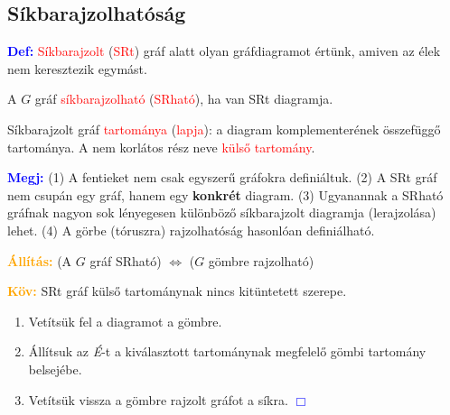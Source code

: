 \documentclass[../szamtud.tex]{subfiles}
\begin{document}
    \subsection{Síkbarajzolhatóság}

        \textcolor{blue}{\textbf{Def:}} \textcolor{red}{Síkbarajzolt} (\textcolor{red}{SRt}) gráf alatt olyan gráfdiagramot értünk, amiven az  élek nem keresztezik egymást.

        A $G$ gráf \textcolor{red}{síkbarajzolható} (\textcolor{red}{SRható}), ha van SRt diagramja. 

        Síkbarajzolt gráf \textcolor{red}{tartománya} (\textcolor{red}{lapja}): a diagram komplementerének összefüggő tartománya. A nem korlátos rész neve \textcolor{red}{külső tartomány}. 

        \textcolor{blue}{\textbf{Megj:}} (1) A fentieket nem csak egyszerű gráfokra definiáltuk. (2) A SRt gráf nem csupán egy gráf, hanem egy \textbf{konkrét} diagram. (3) Ugyanannak a SRható gráfnak nagyon sok lényegesen különböző síkbarajzolt diagramja (lerajzolása) lehet. (4) A görbe (tóruszra) rajzolhatóság hasonlóan definiálható.

        \textcolor{orange}{\textbf{Állítás:}} (A $G$ gráf SRható) $\Longleftrightarrow$ ($G$ gömbre rajzolható) 


        \textcolor{orange}{\textbf{Köv:}} SRt gráf külső tartománynak nincs kitüntetett szerepe.


        \begin{enumerate}
            \item Vetítsük fel a diagramot a gömbre.
            \item Állítsuk az \textit{É}-t a kiválasztott tartománynak megfelelő gömbi tartomány belsejébe.
            \item Vetítsük vissza a gömbre rajzolt gráfot a síkra. \textcolor{blue}{$\Box$}
        \end{enumerate}
\end{document}
